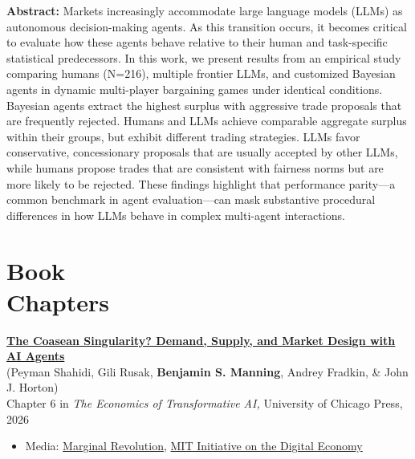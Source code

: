 \documentclass[margin,line,pifont,palatino,courier, 9pt]{res}
\begin{document}
\begin{resume}
\begin{singlespace}
\footnotesize
\textbf{Abstract:}
Markets increasingly accommodate large language models (LLMs) as autonomous decision-making agents. As this transition occurs, it becomes critical to evaluate how these agents behave relative to their human and task-specific statistical predecessors. In this work, we present results from an empirical study comparing humans (N=216), multiple frontier LLMs, and customized Bayesian agents in dynamic multi-player bargaining games under identical conditions. Bayesian agents extract the highest surplus with aggressive trade proposals that are frequently rejected. Humans and LLMs achieve comparable aggregate surplus within their groups, but exhibit different trading strategies. LLMs favor conservative, concessionary proposals that are usually accepted by other LLMs, while humans propose trades that are consistent with fairness norms but are more likely to be rejected. These findings highlight that performance parity---a common benchmark in agent evaluation---can mask substantive procedural differences in how LLMs behave in complex multi-agent interactions.
\end{singlespace}

\section{\sc Book\\Chapters}
\href{https://www.nber.org/books-and-chapters/economics-transformative-ai/coasean-singularity-demand-supply-and-market-design-ai-agents}{\bf The Coasean Singularity? Demand, Supply, and Market Design with AI Agents}\\
(Peyman Shahidi\footnotemark[\value{footnote}], Gili Rusak\footnotemark[\value{footnote}], \textbf{Benjamin S. Manning}\footnotemark[\value{footnote}], Andrey Fradkin\footnotemark[\value{footnote}], \& John J. Horton\footnotemark[\value{footnote}])\\
Chapter 6 in \textit{The Economics of Transformative AI,} University of Chicago Press, 2026
\vspace{0.25cm}
\begin{itemize}
\item Media: \href{https://marginalrevolution.com/marginalrevolution/2025/10/will-there-be-a-coasean-singularity.html}{Marginal Revolution}, \href{https://ide.mit.edu/insights/how-ai-agents-for-commerce-could-shape-future-markets/}{MIT Initiative on the Digital Economy}
\end{itemize}
\vspace{-0.25cm}



\end{resume}
\end{document}
